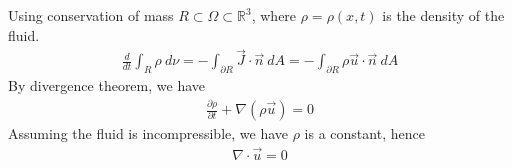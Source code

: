 Using conservation of mass $R \subset \Omega \subset \mathbb{R}^3$,
where $\rho = \rho(x, t)$ is the density of the fluid.
\begin{align*}
  \frac{d}{dt} \int_R \rho \ d \nu = - \int_{\partial R}
  \vec{J}\cdot\vec{n} \ d A = - \int_{\partial R}  \rho \vec{u} \cdot
  \vec{n} \ d A
\end{align*}
By divergence theorem, we have
\begin{align*}
  \frac{\partial \rho}{\partial t} + \nabla(\rho \vec{u}) = 0
\end{align*}
Assuming the fluid is incompressible, we have $\rho$ is a constant, hence
\begin{align*}
  \nabla \cdot \vec{u} = 0
\end{align*}
